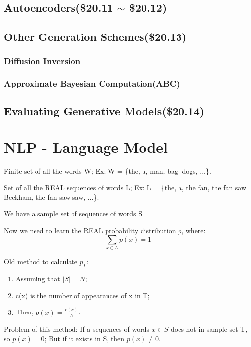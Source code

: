 \documentclass[12pt]{article}
\numberwithin{equation}{section}
\begin{document}
\subsection{Autoencoders(\$20.11 $\sim$ \$20.12)}
\subsection{Other Generation Schemes(\$20.13)}
\subsubsection{Diffusion Inversion}
\subsubsection{Approximate Bayesian Computation(ABC)}
\subsection{Evaluating Generative Models(\$20.14)}
\section{NLP - Language Model}
Finite set of all the words W; Ex: W = \{the, a, man, bag, dogs, ...\}. \par
Set of all the REAL sequences of words L; Ex: L = \{the, a, the fan, the fan saw Beckham, the fan saw saw, ...\}.\par
We have a sample set of sequences of words S.\par
Now we need to learn the REAL probability distribution $p$, where:
\[
\sum_{x \in L} p(x) = 1
\]\par
Old method to calculate $p_{L}$:
\begin{enumerate}
	\item Assuming that $|S| = N$;
	\item c(x) is the number of appearances of x in T;
	\item Then, $p(x)=\frac{c(x)}{N} $.
\end{enumerate}
Problem of this method: If a sequences of words $x \in S$ does not in sample set T, so $p(x)=0$;
But if it exists in S, then $p(x) \neq 0$.
\end{document}
